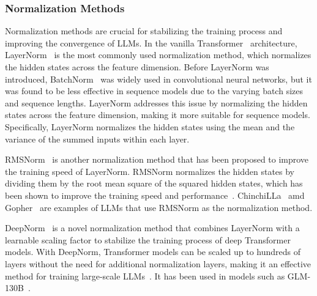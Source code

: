 \subsubsection{Normalization Methods}
\label{subsubsec:normalization}
Normalization methods are crucial for stabilizing the training process and improving the convergence of LLMs.
In the vanilla Transformer~\cite{vaswani2023attention} architecture, LayerNorm~\cite{ba2016layer} is the most commonly used normalization method, which normalizes the hidden states across the feature dimension.
Before LayerNorm was introduced, BatchNorm~\cite{ioffe2015batch} was widely used in convolutional neural networks, but it was found to be less effective in sequence models due to the varying batch sizes and sequence lengths.
LayerNorm addresses this issue by normalizing the hidden states across the feature dimension, making it more suitable for sequence models.
Specifically, LayerNorm normalizes the hidden states using the mean and the variance of the summed inputs within each layer.

RMSNorm~\cite{zhang2019root} is another normalization method that has been proposed to improve the training speed of LayerNorm.
RMSNorm normalizes the hidden states by dividing them by the root mean square of the squared hidden states, which has been shown to improve the training speed and performance~\cite{narang2021transformer}.
ChinchiLLa~\cite{hoffmann2022training} amd Gopher~\cite{rae2021scaling} are examples of LLMs that use RMSNorm as the normalization method.

DeepNorm~\cite{wang2022deepnet} is a novel normalization method that combines LayerNorm with a learnable scaling factor to stabilize the training process of deep Transformer models.
With DeepNorm, Transformer models can be scaled up to hundreds of layers without the need for additional normalization layers, making it an effective method for training large-scale LLMs~\cite{wang2022deepnet}.
It has been used in models such as GLM-130B~\cite{zeng2022glm130b}.

